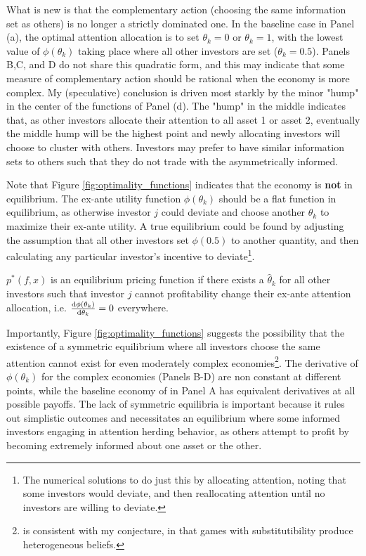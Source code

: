 \documentclass{article}
\begin{document}
What is new is that the complementary action (choosing the same information set as others) is no longer a strictly dominated one. In the baseline case in Panel (a), the optimal attention allocation is to set $\theta_k = 0$ or $\theta_k=1$, with the lowest value of $\phi(\theta_k)$ taking place where all other investors are set ($\theta_k = 0.5$). Panels B,C, and D do not share this quadratic form, and this may indicate that some measure of complementary action should be rational when the economy is more complex. My (speculative) conclusion is driven most starkly by the minor "hump" in the center of the functions of Panel (d). The "hump" in the middle indicates that, as other investors allocate their attention to all asset 1 or asset 2, eventually the middle hump will be the highest point and newly allocating investors will choose to cluster with others. Investors may prefer to have similar information sets to others such that they do not trade with the asymmetrically informed. 

Note that Figure \ref{fig:optimality_functions} indicates that the economy is \textbf{not} in equilibrium. The ex-ante utility function $\phi(\theta_k)$ should be a flat function in equilibrium, as otherwise investor $j$ could deviate and choose another $\theta_k$ to maximize their ex-ante utility. A true equilibrium could be found by adjusting the assumption that all other investors set $\phi(0.5)$ to another quantity, and then calculating any particular investor's incentive to deviate\footnote{The numerical solutions to \textcite{kacperczyk_rational_2016} do just this by allocating attention, noting that some investors would deviate, and then reallocating attention until no investors are willing to deviate.}.

\begin{lemma}
    $p^*(f,x)$ is an equilibrium pricing function if there exists a $\hat \theta_k$ for all other investors such that investor $j$ cannot profitability change their ex-ante attention allocation, i.e. $\derivative{\phi(\theta_k)}{\theta_k} = 0$ everywhere.
\end{lemma}

Importantly, Figure \ref{fig:optimality_functions} suggests the possibility that the existence of a symmetric equilibrium where all investors choose the same attention cannot exist for even moderately complex economies\footnote{\textcite{hellwig_knowing_2009} is consistent with my conjecture, in that games with substitutibility produce heterogeneous beliefs.}. The derivative of $\phi(\theta_k)$ for the complex economies (Panels B-D) are non constant at different points, while the baseline economy of \textcite{kacperczyk_rational_2016} in Panel A has equivalent derivatives at all possible payoffs. The lack of symmetric equilibria is important because it rules out simplistic outcomes and necessitates an equilibrium where some informed investors engaging in attention herding behavior, as others attempt to profit by becoming extremely informed about one asset or the other. 
\end{document}
